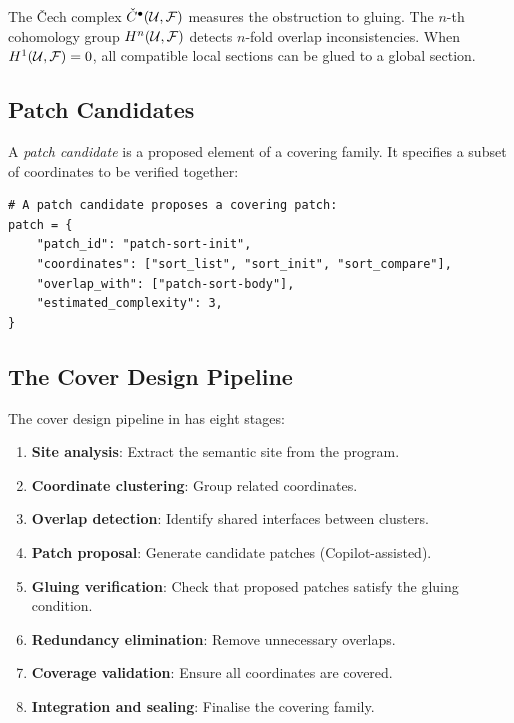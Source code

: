 \documentclass[11pt]{article}
\newcommand{\covfam}{\mathcal{U}}
\begin{document}
\begin{definition}\label{def:cech}
The \v{C}ech complex $\Cech^\bullet(\covfam, \mathcal{F})$ measures the
obstruction to gluing.  The $n$-th cohomology group $\Hcoh{n}(\covfam,
\mathcal{F})$ detects $n$-fold overlap inconsistencies.  When
$\Hcoh{1}(\covfam, \mathcal{F}) = 0$, all compatible local sections can be
glued to a global section.
\end{definition}

\subsection{Patch Candidates}

A \emph{patch candidate} is a proposed element of a covering family.  It
specifies a subset of coordinates to be verified together:

\begin{lstlisting}[style=jugeo-python]
# A patch candidate proposes a covering patch:
patch = {
    "patch_id": "patch-sort-init",
    "coordinates": ["sort_list", "sort_init", "sort_compare"],
    "overlap_with": ["patch-sort-body"],
    "estimated_complexity": 3,
}
\end{lstlisting}

\subsection{The Cover Design Pipeline}

The cover design pipeline in \JuGeo{} has eight stages:
\begin{enumerate}[leftmargin=2em]
  \item \textbf{Site analysis}: Extract the semantic site from the program.
  \item \textbf{Coordinate clustering}: Group related coordinates.
  \item \textbf{Overlap detection}: Identify shared interfaces between clusters.
  \item \textbf{Patch proposal}: Generate candidate patches (Copilot-assisted).
  \item \textbf{Gluing verification}: Check that proposed patches satisfy the
        gluing condition.
  \item \textbf{Redundancy elimination}: Remove unnecessary overlaps.
  \item \textbf{Coverage validation}: Ensure all coordinates are covered.
  \item \textbf{Integration and sealing}: Finalise the covering family.
\end{enumerate}
\end{document}
